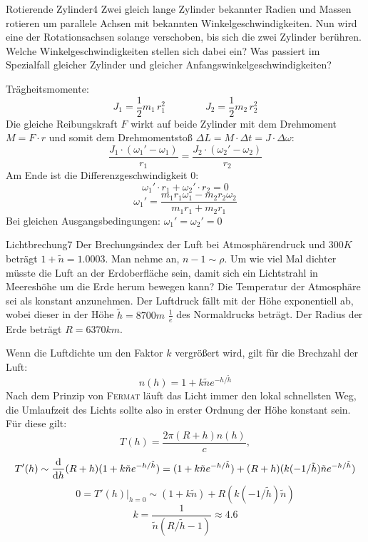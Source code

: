 \begin{problem}{Rotierende Zylinder}{4}
Zwei gleich lange Zylinder bekannter Radien und Massen rotieren um parallele Achsen mit bekannten Winkelgeschwindigkeiten. Nun wird eine der Rotationsachsen solange verschoben, bis sich die zwei Zylinder berühren. Welche Winkelgeschwindigkeiten stellen sich dabei ein? Was passiert im Spezialfall gleicher Zylinder und gleicher Anfangswinkelgeschwindigkeiten?
\begin{solution}
Trägheitsmomente:
\[
 J_1 = \frac 1 2 m_1\,r_1^2 \qquad\qquad J_2 = \frac 1 2 m_2\,r_2^2
\]
Die gleiche Reibungskraft $F$ wirkt auf beide Zylinder mit dem Drehmoment $M = F\cdot r$ und somit dem Drehmomentstoß $\Delta L = M\cdot\Delta t = J\cdot\Delta\omega$:
\[
 \frac{J_1\cdot(\omega_1'-\omega_1)}{r_1} = \frac{J_2\cdot(\omega_2'-\omega_2)}{r_2}
\]
Am Ende ist die Differenzgeschwindigkeit 0:
\[
 \omega_1'\cdot r_1 + \omega_2'\cdot r_2 = 0
\]
\[
 \omega_1' = \frac{m_1r_1\omega_1-m_2r_2\omega_2}{m_1r_1+m_2r_1}
\]
Bei gleichen Ausgangsbedingungen: $\omega_1' = \omega_2' = 0$
\end{solution}
\end{problem}

\begin{problem}{Lichtbrechung}{7}
Der Brechungsindex der Luft bei Atmosphärendruck und $300\unit{K}$ beträgt $1+\tilde n = 1.0003$. Man nehme an, $n-1 \sim \rho$. Um wie viel Mal dichter müsste die Luft an der Erdoberfläche sein, damit sich ein Lichtstrahl in Meereshöhe um die Erde herum bewegen kann? Die Temperatur der Atmosphäre sei als konstant anzunehmen. Der Luftdruck fällt mit der Höhe exponentiell ab, wobei dieser in der Höhe $\tilde h = 8700\unit{m}$ $\frac 1e$ des Normaldrucks beträgt. Der Radius der Erde beträgt $R=6370\unit{km}$.
\begin{solution}
Wenn die Luftdichte um den Faktor $k$ vergrößert wird, gilt für die Brechzahl der Luft:
\[
n(h) = 1 + k \tilde n  e^{-h / \tilde h}
\]
Nach dem Prinzip von \textsc{Fermat} läuft das Licht immer den lokal schnellsten Weg, die Umlaufzeit des Lichts sollte also in erster Ordnung der Höhe konstant sein. Für diese gilt:
\[
T(h) = \frac{2 \pi (R+h) n(h)}{c},
\]
\[
T'(h) \sim \frac{\mathrm{d}}{\mathrm{d} h} (R+h)(1 + k \tilde n  e^{-h / \tilde h}) = (1 + k \tilde n  e^{-h / \tilde h})+(R+h)(k (-1/\tilde h) \tilde n  e^{-h / \tilde h})
\]
\[
0 = \left. T'(h) \right|_{h=0} \sim (1 + k \tilde n)+R (k (-1/\tilde h) \tilde n)
\]
\[
k = \frac{1}{\tilde n (R/ \tilde h - 1)} \approx 4.6
\]
\end{solution}
\end{problem}

